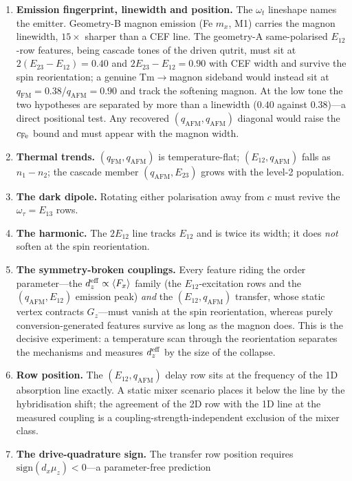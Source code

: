 \documentclass[11pt,a4paper]{article}
\newcommand{\qafm}{q_{\mathrm{AFM}}}
\newcommand{\qfm}{q_{\mathrm{FM}}}
\begin{document}
\begin{enumerate}
\item \textbf{Emission fingerprint, linewidth and position.}  The
  $\omega_t$ lineshape names the emitter.  Geometry-B magnon emission
  (Fe $m_x$, M1) carries the magnon linewidth, $15\times$ sharper than
  a CEF line.  The geometry-A same-polarised $E_{12}$-row features,
  being cascade tones of the driven qutrit, must sit at
  $2(E_{23}{-}E_{12})=0.40$ and $2E_{23}{-}E_{12}=0.90$ with CEF
  width and survive the spin reorientation; a genuine Tm$\to$magnon
  sideband would instead sit at $\qfm=0.38$/$\qafm=0.90$ and track
  the softening magnon.  At the low tone the two hypotheses are
  separated by more than a linewidth ($0.40$ against $0.38$)---a
  direct positional test.  Any recovered $(\qafm,\qafm)$ diagonal
  would raise the $c_{\rm Fe}$ bound and must appear with the magnon
  width.
\item \textbf{Thermal trends.}  $(\qfm,\qafm)$ is temperature-flat;
  $(E_{12},\qafm)$ falls as $n_1-n_2$; the cascade member
  $(\qafm,E_{23})$ grows with the level-2 population.
\item \textbf{The dark dipole.}  Rotating either polarisation away from
  $c$ must revive the $\omega_\tau=E_{13}$ rows.
\item \textbf{The harmonic.}  The $2E_{12}$ line tracks $E_{12}$ and is
  twice its width; it does \emph{not} soften at the spin reorientation.
\item \textbf{The symmetry-broken couplings.}  Every feature riding
  the order parameter---the $d_z^{\rm eff}\propto\langle F_x\rangle$
  family (the $E_{12}$-excitation rows and the $(\qafm,E_{12})$
  emission peak) \emph{and} the $(E_{12},\qafm)$ transfer, whose static
  vertex contracts $G_z$---must vanish at the spin reorientation,
  whereas purely conversion-generated features survive as long as the
  magnon does.  This is the decisive experiment: a temperature scan
  through the reorientation separates the mechanisms and measures
  $d_z^{\rm eff}$ by the size of the collapse.
\item \textbf{Row position.}  The $(E_{12},\qafm)$ delay row sits at
  the frequency of the 1D absorption line exactly.  A static mixer
  scenario places it below the line by the hybridisation shift; the
  agreement of the 2D row with the 1D line at the measured coupling is
  a coupling-strength-independent exclusion of the mixer class.
\item \textbf{The drive-quadrature sign.}  The transfer row position
  requires $\mathrm{sign}(d_x\mu_z)<0$---a parameter-free prediction

\end{enumerate}
\end{document}
